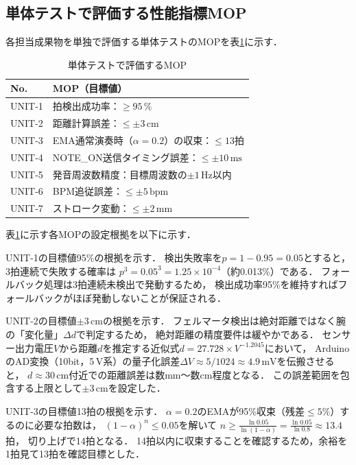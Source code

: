 \documentclass[lualatex,book,paper=a4paper,jafontsize=11.5pt,jafontscale=1.05,oneside]{jlreq}
\begin{document}
\subsection{単体テストで評価する性能指標MOP}

各担当成果物を単独で評価する単体テストのMOPを表\ref{tab:mop-unit}に示す．

\begin{table}[H]
  \centering
  \caption{単体テストで評価するMOP}
  \label{tab:mop-unit}
  \begin{tabularx}{\linewidth}{lX}
    \toprule
    No. & MOP（目標値） \\
    \midrule
    UNIT-1 & 拍検出成功率：$\geq 95\,\%$ \\
    UNIT-2 & 距離計算誤差：$\leq \pm 3\,\mathrm{cm}$ \\
    UNIT-3 & EMA通常演奏時（$\alpha=0.2$）の収束：$\leq 13$拍 \\
    UNIT-4 & NOTE\_ON送信タイミング誤差：$\leq \pm 10\,\mathrm{ms}$ \\
    UNIT-5 & 発音周波数精度：目標周波数の$\pm 1\,\mathrm{Hz}$以内 \\
    UNIT-6 & BPM追従誤差：$\leq \pm 5\,\mathrm{bpm}$ \\
    UNIT-7 & ストローク変動：$\leq \pm 2\,\mathrm{mm}$ \\
    \bottomrule
  \end{tabularx}
\end{table}

表\ref{tab:mop-unit}に示す各MOPの設定根拠を以下に示す．

UNIT-1の目標値95\%の根拠を示す．
検出失敗率を$p = 1 - 0.95 = 0.05$とすると，3拍連続で失敗する確率は
$p^3 = 0.05^3 = 1.25 \times 10^{-4}$（約0.013\%）である．
フォールバック処理は3拍連続未検出で発動するため，
検出成功率95\%を維持すればフォールバックがほぼ発動しないことが保証される．

UNIT-2の目標値$\pm 3\,\mathrm{cm}$の根拠を示す．
フェルマータ検出は絶対距離ではなく腕の「変化量」$\Delta d$で判定するため，
絶対距離の精度要件は緩やかである．
センサー出力電圧$V$から距離$d$を推定する近似式$d = 27.728 \times V^{-1.2045}$において，
ArduinoのAD変換（10bit，5\,V系）の量子化誤差$\Delta V \approx 5/1024 \approx 4.9\,\mathrm{mV}$を伝搬させると，
$d \approx 30\,\mathrm{cm}$付近での距離誤差は数mm〜数cm程度となる．
この誤差範囲を包含する上限として$\pm 3\,\mathrm{cm}$を設定した．

UNIT-3の目標値13拍の根拠を示す．
$\alpha=0.2$のEMAが95\%収束（残差$\leq 5\%$）するのに必要な拍数は，
$(1-\alpha)^n \leq 0.05$を解いて
$n \geq \frac{\ln 0.05}{\ln(1-\alpha)} = \frac{\ln 0.05}{\ln 0.8} \approx 13.4$拍，
切り上げで14拍となる．
14拍以内に収束することを確認するため，余裕を1拍見て13拍を確認目標とした．
\end{document}
